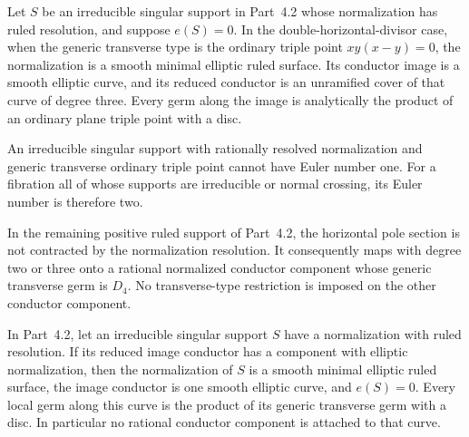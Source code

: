 
\begin{proposition}[P4.31]\hypertarget{tag-02X4}{}\label{night:P4.31}\label{stmt:P4.31}


Let $S$ be an irreducible singular support in Part~4.2 whose
normalization has ruled resolution, and suppose $e(S)=0$.
In the double-horizontal-divisor case, when the generic
transverse type is the ordinary triple point $xy(x-y)=0$,
the normalization is a smooth minimal elliptic ruled surface.
Its conductor image is a smooth elliptic curve, and its
reduced conductor is an unramified cover of that curve of
degree three. Every germ along the image is analytically
the product of an ordinary plane triple point with a disc.
\end{proposition}

\begin{proposition}[P4.34]\hypertarget{tag-02X7}{}\label{night:P4.34}\label{stmt:P4.34}


An irreducible singular support with rationally resolved
normalization and generic transverse ordinary triple point
cannot have Euler number one. For a fibration all of whose
supports are irreducible or normal crossing, its Euler number
is therefore two.
\end{proposition}

\begin{proposition}[P4.54]\hypertarget{tag-02XT}{}\label{night:P4.54}\label{stmt:P4.54}


In the remaining positive ruled support of Part~4.2,
the horizontal pole section is not contracted by the
normalization resolution. It consequently maps with
degree two or three onto a rational normalized conductor
component whose generic transverse germ is $D_4$.
No transverse-type restriction is imposed on the other
conductor component.
\end{proposition}

\begin{proposition}[P4R.13]\hypertarget{tag-02Y6}{}\label{night:P4R.13}\label{stmt:P4R.13}


In Part~4.2, let an irreducible singular support $S$ have a
normalization with ruled resolution. If its reduced image
conductor has a component with elliptic normalization, then
the normalization of $S$ is a smooth minimal elliptic ruled
surface, the image conductor is one smooth elliptic curve,
and $e(S)=0$. Every local germ along this curve is the product
of its generic transverse germ with a disc. In particular no
rational conductor component is attached to that curve.
\end{proposition}

